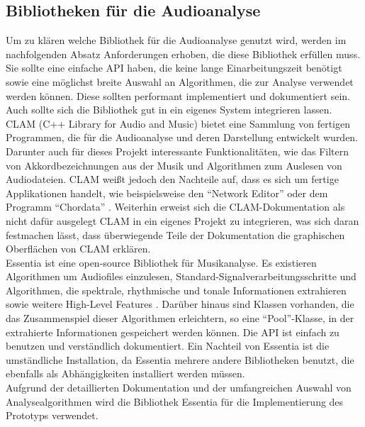 \documentclass[11pt,a4paper]{article}
\begin{document}
\newpage
\subsection{Bibliotheken für die Audioanalyse}
\label{sec:BibAudioanalyse}
Um zu klären welche Bibliothek für die Audioanalyse genutzt wird, werden im nachfolgenden Absatz Anforderungen erhoben, die diese Bibliothek erfüllen muss.\\
Sie sollte eine einfache API haben, die keine lange Einarbeitungszeit benötigt sowie eine möglichst breite Auswahl an Algorithmen, die zur Analyse verwendet werden können. Diese sollten performant implementiert und dokumentiert sein. Auch sollte sich die Bibliothek gut in ein eigenes System integrieren lassen.\\
CLAM (C++ Library for Audio and Music)\cite{clamProjekt} bietet eine Sammlung von fertigen Programmen, die für die Audioanalyse und deren Darstellung entwickelt wurden. Darunter auch für dieses Projekt interessante Funktionalitäten, wie das Filtern von Akkordbezeichnungen aus der Musik und Algorithmen zum Auslesen von Audiodateien. CLAM weißt jedoch den Nachteile auf, dass es sich um fertige Applikationen handelt, wie beispielsweise den ``Network Editor''\cite{clamProjektNetEditor} oder dem Programm ``Chordata'' \cite{clamProjektChorData}. Weiterhin erweist sich die CLAM-Dokumentation als nicht dafür ausgelegt CLAM in ein eigenes Projekt zu integrieren, was sich daran festmachen lässt, dass überwiegende Teile der Dokumentation die graphischen Oberflächen von CLAM erklären.\\
Essentia ist eine open-source Bibliothek für Musikanalyse. Es existieren Algorithmen um Audiofiles einzulesen, Standard-Signalverarbeitungsschritte und Algorithmen, die spektrale, rhythmische und tonale Informationen extrahieren sowie weitere High-Level Features \cite{Bogdanov:2013:EOL:2502081.2502229}. Darüber hinaus sind Klassen vorhanden, die das Zusammenspiel dieser Algorithmen erleichtern, so eine ``Pool''-Klasse, in der extrahierte Informationen gespeichert werden können. Die API ist einfach zu benutzen und verständlich dokumentiert. Ein Nachteil von Essentia ist die umständliche Installation, da Essentia mehrere andere Bibliotheken benutzt, die ebenfalls als Abhängigkeiten installiert werden müssen.\\
Aufgrund der detaillierten Dokumentation und der umfangreichen Auswahl von Analysealgorithmen wird die Bibliothek Essentia für die Implementierung des Prototyps verwendet.
\end{document}
